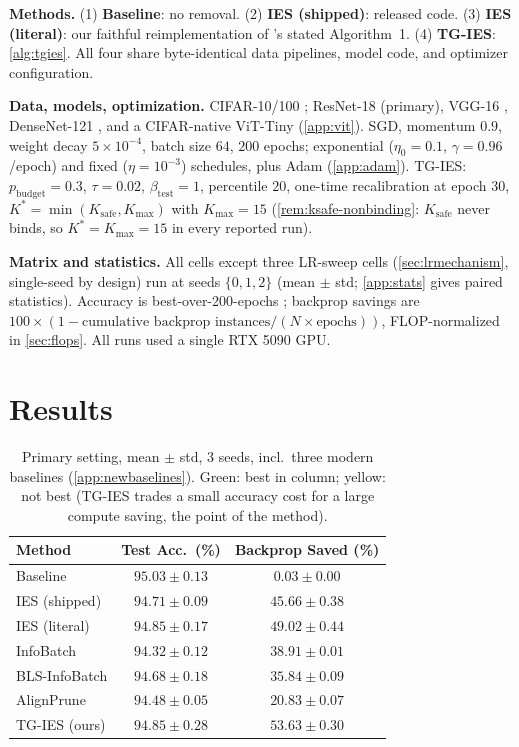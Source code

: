 \documentclass{article}
\newcommand{\win}[1]{\cellcolor{tgwin}#1}
\newcommand{\lose}[1]{\cellcolor{tglose}#1}
\theoremstyle{plain}
\theoremstyle{definition}
\theoremstyle{remark}
\begin{document}
\textbf{Methods.} (1) \textbf{Baseline}: no removal. (2) \textbf{IES (shipped)}: released code. (3) \textbf{IES (literal)}: our faithful reimplementation of \citet{yuan2025instance}'s stated Algorithm~1. (4) \textbf{TG-IES}: \cref{alg:tgies}. All four share byte-identical data pipelines, model code, and optimizer configuration.

\textbf{Data, models, optimization.} CIFAR-10/100 \citep{krizhevsky2009learning}; ResNet-18 \citep{he2016deep} (primary), VGG-16 \citep{simonyan2015very}, DenseNet-121 \citep{huang2017densely}, and a CIFAR-native ViT-Tiny (\cref{app:vit}). SGD, momentum $0.9$, weight decay $5{\times}10^{-4}$, batch size $64$, $200$ epochs; exponential ($\eta_0{=}0.1$, $\gamma{=}0.96$/epoch) and fixed ($\eta{=}10^{-3}$) schedules, plus Adam (\cref{app:adam}). TG-IES: $p_{\mathrm{budget}}=0.3$, $\tau=0.02$, $\beta_{\mathrm{test}}=1$, percentile $20$, one-time recalibration at epoch 30, $K^*=\min(K_{\mathrm{safe}},K_{\max})$ with $K_{\max}=15$ (\cref{rem:ksafe-nonbinding}: $K_{\mathrm{safe}}$ never binds, so $K^*=K_{\max}=15$ in every reported run).

\textbf{Matrix and statistics.} All cells except three LR-sweep cells (\cref{sec:lrmechanism}, single-seed by design) run at seeds $\{0,1,2\}$ (mean $\pm$ std; \cref{app:stats} gives paired statistics). Accuracy is best-over-200-epochs \citep{yuan2025instance}; backprop savings are $100\times(1 - \text{cumulative backprop instances}/(N\times\text{epochs}))$, FLOP-normalized in \cref{sec:flops}. All runs used a single RTX 5090 GPU.

\section{Results}
\label{sec:results}

\begin{table}[t]
\caption{Primary setting, mean $\pm$ std, 3 seeds, incl.\ three modern baselines (\cref{app:newbaselines}). \colorbox{tgwin}{Green}: best in column; \colorbox{tglose}{yellow}: not best (TG-IES trades a small accuracy cost for a large compute saving, the point of the method).}
\label{tab:primary}
\centering
\small
\begin{tabular}{lcc}
\toprule
Method & Test Acc.\ (\%) & Backprop Saved (\%) \\
\midrule
Baseline & $95.03 \pm 0.13$ & $0.03 \pm 0.00$ \\
IES (shipped) & $94.71 \pm 0.09$ & $45.66 \pm 0.38$ \\
IES (literal) & $94.85 \pm 0.17$ & $49.02 \pm 0.44$ \\
InfoBatch \citep{qin2024infobatch} & $94.32\pm0.12$ & $38.91\pm0.01$ \\
BLS-InfoBatch \citep{zhou2026bls} & $94.68\pm0.18$ & $35.84\pm0.09$ \\
AlignPrune \citep{qin2026alignprune} & $94.48\pm0.05$ & $20.83\pm0.07$ \\
\win{TG-IES (ours)} & \lose{$94.85 \pm 0.28$} & \win{$\mathbf{53.63 \pm 0.30}$} \\
\bottomrule
\end{tabular}
\end{table}
\end{document}

